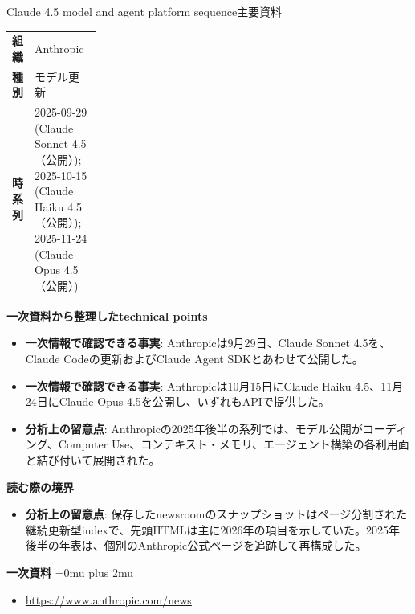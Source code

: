 \begin{technicalnote}{Claude 4.5 model and agent platform sequence}{主要資料}
\begingroup
\begin{tabularx}{\linewidth}{@{}>{\bfseries}p{0.22\linewidth}X@{}}
組織 & Anthropic \\
種別 & モデル更新 \\
時系列 & 2025-09-29 (Claude Sonnet 4.5（公開）); 2025-10-15 (Claude Haiku 4.5（公開）); 2025-11-24 (Claude Opus 4.5（公開）) \\
\end{tabularx}
\smallskip
{\bfseries 一次資料から整理したtechnical points}
\begin{itemize}[leftmargin=1.5em,itemsep=0.35em]
\item \textbf{一次情報で確認できる事実}: Anthropicは9月29日、Claude Sonnet 4.5を、Claude Codeの更新およびClaude Agent SDKとあわせて公開した。
\item \textbf{一次情報で確認できる事実}: Anthropicは10月15日にClaude Haiku 4.5、11月24日にClaude Opus 4.5を公開し、いずれもAPIで提供した。
\item \textbf{分析上の留意点}: Anthropicの2025年後半の系列では、モデル公開がコーディング、Computer Use、コンテキスト・メモリ、エージェント構築の各利用面と結び付いて展開された。
\end{itemize}
\begin{minipage}{\linewidth}
{\bfseries 読む際の境界}
\begin{itemize}[leftmargin=1.5em,itemsep=0.35em]
\item \textbf{分析上の留意点}: 保存したnewsroomのスナップショットはページ分割された継続更新型indexで、先頭HTMLは主に2026年の項目を示していた。2025年後半の年表は、個別のAnthropic公式ページを追跡して再構成した。
\end{itemize}
\begin{samepage}
{\bfseries 一次資料}
\begingroup\sloppy
\Urlmuskip=0mu plus 2mu\relax
\begin{itemize}[leftmargin=1.5em,itemsep=0.25em]
\item {\scriptsize\url{https://www.anthropic.com/news}}
\end{itemize}
\endgroup
\end{samepage}
\end{minipage}
\endgroup
\end{technicalnote}
\medskip

